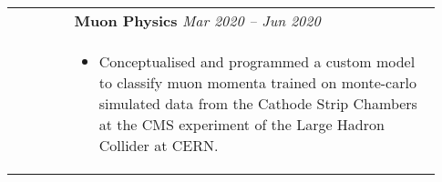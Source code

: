 \documentclass[letterpaper, 10pt, oneside]{article}
\newcommand{\bdit}[1]{{\textbf{#1}}}
\begin{document}
\begin{longtable}{@{} p{0.13\linewidth} p{0.8\linewidth}}

                                                      & \bdit{Muon Physics} \hfill \textsl{Mar 2020 -- Jun 2020}                                                                                                                                              \\
                                                      & \parbox{0.8\textwidth}{                                                                                                                                                                               %
        \begin{itemize}[leftmargin=*, itemsep=-0.88ex, topsep=0.2ex]
            \item Conceptualised and programmed a custom model to classify muon momenta trained on monte-carlo simulated data from the Cathode Strip Chambers at the CMS experiment of the Large Hadron Collider at CERN.
        \end{itemize}
    }                                                                                                                                                                                                                                                         \\
    \\[-1.4ex]


\end{longtable}
\end{document}
